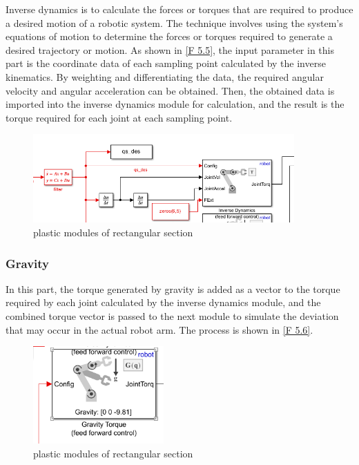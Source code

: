 Inverse dynamics is to calculate the forces or torques that are required to produce a desired motion of a robotic system. The technique involves using the system's equations of motion to determine the forces or torques required to generate a desired trajectory or motion. As shown in \autoref{F 5.5}, the input parameter in this part is the coordinate data of each sampling point calculated by the inverse kinematics. By weighting and differentiating the data, the required angular velocity and angular acceleration can be obtained. Then, the obtained data is imported into the inverse dynamics module for calculation, and the result is the torque required for each joint at each sampling point.

\begin{figure}[htbp]
	\centering
	\includegraphics[width=10cm]{./fig/ID.png}
	\caption{plastic modules of rectangular section  }
	\label{F 5.5}
\end{figure}

\subsubsection*{Gravity}


In this part, the torque generated by gravity is added as a vector to the torque required by each joint calculated by the inverse dynamics module, and the combined torque vector is passed to the next module to simulate the deviation that may occur in the actual robot arm. The process is shown in \autoref{F 5.6}.


\begin{figure}[htbp]
	\centering
	\includegraphics[width=5cm]{./fig/G.png}
	\caption{plastic modules of rectangular section  }
	\label{F 5.6}
\end{figure}


